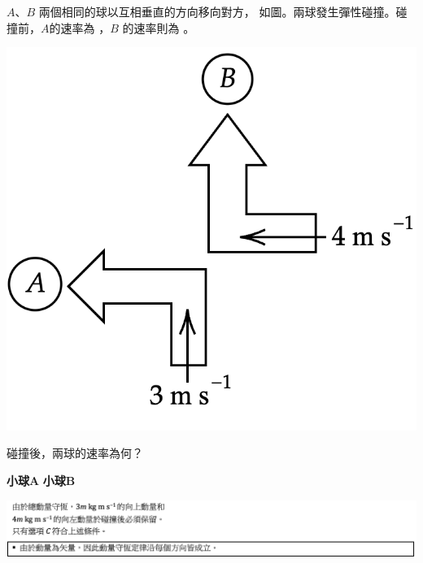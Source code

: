 {
    $A$、$B$ 兩個相同的球以互相垂直的方向移向對方， 如圖。兩球發生彈性碰撞。碰撞前，$A$的速率為 ，$B$ 的速率則為 。
    \par{\par\centering\includegraphics[width=.3\textwidth]{./img/ch5_momentum_mc_2024-05-11-21-56-50.png}\par}
    碰撞後，兩球的速率為何？
    \begin{tasks}
        \task [] \textbf{小球}$\mathbf{A}$ \tab\tab \textbf{小球}$\mathbf{B}$ \vspace{1em}
        \task {} \tab\tab {}
        \task {} \tab\tab {}
        \task {} \tab\tab {}
        \task {} \tab\tab {}
    \end{tasks}

}{
    \par{\par\centering\includegraphics[width=\textwidth]{./img/ch5_momentum_mc_2024-05-11-22-49-21.png}\par}
}

